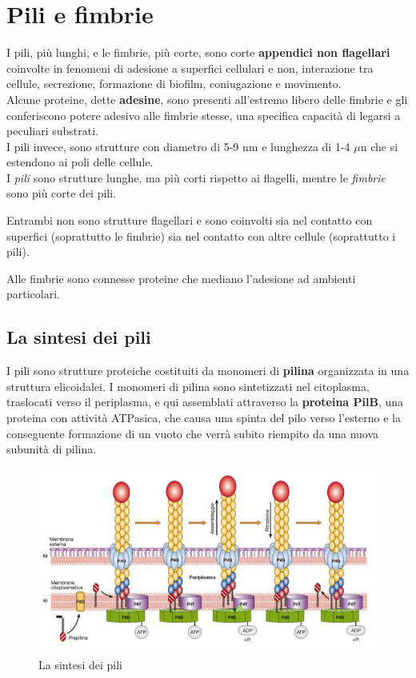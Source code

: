 \documentclass[11pt]{book}
\begin{document}
\section{Pili e fimbrie}
I pili, più lunghi, e le fimbrie, più corte, sono corte \textbf{appendici non flagellari} coinvolte in fenomeni di adesione a superfici cellulari e non, interazione tra cellule, secrezione, formazione di biofilm, coniugazione e movimento.\\
Alcune proteine, dette \textbf{adesine}, sono presenti all'estremo libero delle fimbrie e gli conferiscono potere adesivo alle fimbrie stesse, una specifica capacità di legarsi a peculiari substrati.\\
I pili invece, sono strutture con diametro di 5-9 nm e lunghezza di 1-4 $\mu$n che si estendono ai poli delle cellule.\\
I \emph{pili} sono strutture lunghe, ma più corti rispetto ai flagelli, mentre le \emph{fimbrie} sono più corte dei pili.

Entrambi non sono strutture flagellari e sono coinvolti sia nel contatto con superfici (soprattutto le fimbrie) sia nel contatto con altre cellule (soprattutto i pili).

\vspace{1em}
Alle fimbrie sono connesse proteine che mediano l'adesione ad ambienti particolari.\\


\subsection{La sintesi dei pili}
I pili sono strutture proteiche costituiti da monomeri di \textbf{pilina} organizzata in una struttura elicoidalei. I monomeri di pilina sono sintetizzati nel citoplasma, traslocati verso il periplasma, e qui assemblati attraverso la \textbf{proteina PilB}, una proteina con attività ATPasica, che causa una spinta del pilo verso l’esterno e la conseguente formazione di un vuoto che verrà subito riempito da una nuova subunità di pilina.

\begin{figure}[htp]
\centering
\includegraphics[scale=0.4]{img/Sintesi pili.png}
\caption{La sintesi dei pili}
\label{}
\end{figure}
\end{document}
